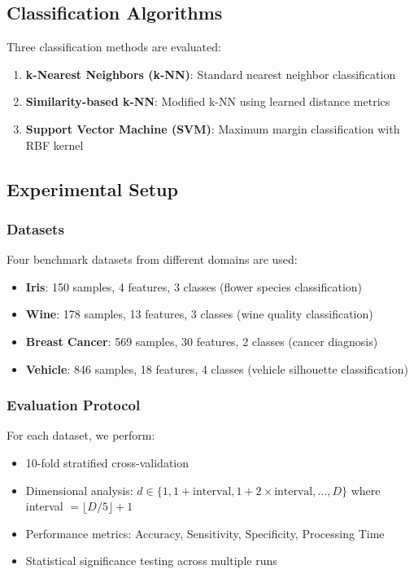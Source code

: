 \documentclass[12pt,a4paper]{article}
\begin{document}
\subsection{Classification Algorithms}

Three classification methods are evaluated:

\begin{enumerate}
    \item \textbf{k-Nearest Neighbors (k-NN)}: Standard nearest neighbor classification
    \item \textbf{Similarity-based k-NN}: Modified k-NN using learned distance metrics
    \item \textbf{Support Vector Machine (SVM)}: Maximum margin classification with RBF kernel
\end{enumerate}

\subsection{Experimental Setup}

\subsubsection{Datasets}

Four benchmark datasets from different domains are used:

\begin{itemize}
    \item \textbf{Iris}: 150 samples, 4 features, 3 classes (flower species classification)
    \item \textbf{Wine}: 178 samples, 13 features, 3 classes (wine quality classification) 
    \item \textbf{Breast Cancer}: 569 samples, 30 features, 2 classes (cancer diagnosis)
    \item \textbf{Vehicle}: 846 samples, 18 features, 4 classes (vehicle silhouette classification)
\end{itemize}

\subsubsection{Evaluation Protocol}

For each dataset, we perform:
\begin{itemize}
    \item 10-fold stratified cross-validation
    \item Dimensional analysis: $d \in \{1, 1+\text{interval}, 1+2\times\text{interval}, \ldots, D\}$ where interval $= \lfloor D/5 \rfloor + 1$
    \item Performance metrics: Accuracy, Sensitivity, Specificity, Processing Time
    \item Statistical significance testing across multiple runs
\end{itemize}
\end{document}
